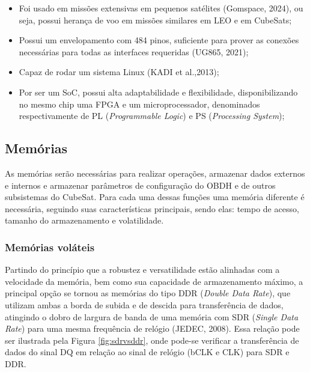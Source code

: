 \begin{itemize}
	\item Foi usado em missões extensivas em pequenos satélites (Gomspace, 2024), ou seja, possui herança de voo em missões similares em LEO e em CubeSats;
	\item Possui um envelopamento com 484 pinos, suficiente para prover as conexões necessárias para todas as interfaces requeridas (UG865, 2021);
	\item Capaz de rodar um sistema Linux (KADI et al.,2013);
	\item Por ser um SoC, possui alta adaptabilidade e flexibilidade, disponibilizando no mesmo chip uma FPGA e um microprocessador, denominados respectivamente de PL (\textit{Programmable Logic}) e PS (\textit{Processing System});
\end{itemize}

\subsection{Memórias}

As memórias serão necessárias para realizar operações, armazenar dados externos e internos e armazenar parâmetros de configuração do OBDH e de outros subsistemas do CubeSat. Para cada uma dessas funções uma memória diferente é necessária, seguindo suas características principais, sendo elas: tempo de acesso, tamanho do armazenamento e volatilidade.

\subsubsection{Memórias voláteis}

Partindo do princípio que a robustez e versatilidade estão alinhadas com a velocidade da memória, bem como sua capacidade de armazenamento máximo, a principal opção se tornou as memórias do tipo DDR (\textit{Double Data Rate}), que utilizam ambas a borda de subida e de descida para transferência de dados, atingindo o dobro de largura de banda de uma memória com SDR (\textit{Single Data Rate}) para uma mesma frequência de relógio (JEDEC, 2008). Essa relação pode ser ilustrada pela Figura \ref{fig:sdrvsddr}, onde pode-se verificar a transferência de dados do sinal DQ em relação ao sinal de relógio (bCLK e CLK) para SDR e DDR.

